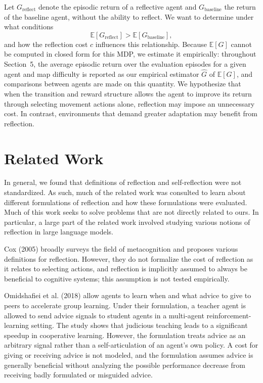 \documentclass[11pt]{article}
\begin{document}
Let $G_{\text{reflect}}$ denote the episodic return of a reflective agent and $G_{\text{baseline}}$ the return of the baseline agent, without the ability to reflect. We want to determine under what conditions
\[
\mathbb{E}[G_{\text{reflect}}] > \mathbb{E}[G_{\text{baseline}}],
\]
and how the reflection cost $c$ influences this relationship. Because $\mathbb{E}[G]$ cannot be computed in closed form for this MDP, we estimate it empirically: throughout Section~5, the average episodic return over the evaluation episodes for a given agent and map difficulty is reported as our empirical estimator $\hat{G}$ of $\mathbb{E}[G]$, and comparisons between agents are made on this quantity. We hypothesize that when the transition and reward structure allows the agent to improve its return through selecting movement actions alone, reflection may impose an unnecessary cost. In contrast, environments that demand greater adaptation may benefit from reflection.

\section{Related Work}

In general, we found that definitions of reflection and self-reflection were not standardized. As such, much of the related work was consulted to learn about different formulations of reflection and how these formulations were evaluated. Much of this work seeks to solve problems that are not directly related to ours. In particular, a large part of the related work involved studying various notions of reflection in large language models.

Cox (2005) broadly surveys the field of metacognition and proposes various definitions for reflection. However, they do not formalize the cost of reflection as it relates to selecting actions, and reflection is implicitly assumed to always be beneficial to cognitive systems; this assumption is not tested empirically.

Omidshafiei et al. (2018) allow agents to learn when and what advice to give to peers to accelerate group learning. Under their formulation, a teacher agent is allowed to send advice signals to student agents in a multi-agent reinforcement-learning setting. The study shows that judicious teaching leads to a significant speedup in cooperative learning. However, the formulation treats advice as an arbitrary signal rather than a self-articulation of an agent's own policy. A cost for giving or receiving advice is not modeled, and the formulation assumes advice is generally beneficial without analyzing the possible performance decrease from receiving badly formulated or misguided advice.
\end{document}
